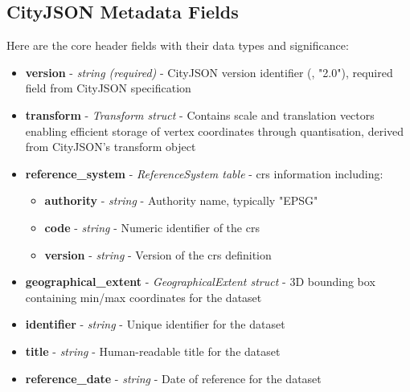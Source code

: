 \subsection{CityJSON Metadata Fields}
\label{methodology:header:cityjson_fields}

Here are the core header fields with their data types and significance:

\begin{itemize}
  \item \textbf{version} - \textit{string (required)} - CityJSON version identifier (\eg, "2.0"), required field from CityJSON specification \citep{cityjson_spec}

  \item \textbf{transform} - \textit{Transform struct} - Contains scale and translation vectors enabling efficient storage of vertex coordinates through quantisation, derived from CityJSON's transform object \citep{cityjson_spec}

  \item \textbf{reference\_system} - \textit{ReferenceSystem table} - \ac{crs} information including:
    \begin{itemize}
      \item \textbf{authority} - \textit{string} - Authority name, typically "EPSG"
      \item \textbf{code} - \textit{string} - Numeric identifier of the \ac{crs}
      \item \textbf{version} - \textit{string} - Version of the \ac{crs} definition
    \end{itemize}

  \item \textbf{geographical\_extent} - \textit{GeographicalExtent struct} - 3D bounding box containing min/max coordinates for the dataset \citep{cityjson_spec}

  \item \textbf{identifier} - \textit{string} - Unique identifier for the dataset

  \item \textbf{title} - \textit{string} - Human-readable title for the dataset

  \item \textbf{reference\_date} - \textit{string} - Date of reference for the dataset


\end{itemize}

